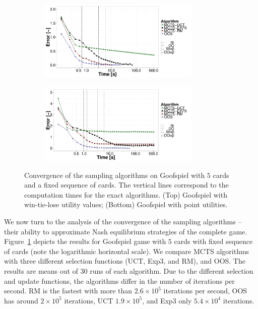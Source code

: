 \begin{figure}[t!]
	\begin{subfigure}{1\textwidth}
		\centering
		\includegraphics[width=0.85\textwidth]{figures/convergence-gs-tf.pdf}%
	\end{subfigure}
	\begin{subfigure}{1\textwidth}
		\centering
		\includegraphics[width=0.85\textwidth]{figures/convergence-gs-ff.pdf}%
	\end{subfigure}
\caption{Convergence of the sampling algorithms on Goofspiel with $5$ cards and a fixed sequence of cards.
The vertical lines correspond to the computation times for the exact algorithms.
(Top) Goofspiel with win-tie-lose utility values;
(Bottom) Goofspiel with point utilities.} \label{fig:off:conv:gs}
\end{figure}

We now turn to the analysis of the convergence of the sampling algorithms -- \ie their ability to approximate Nash equilibrium strategies of the complete game.
Figure~\ref{fig:off:conv:gs} depicts the results for Goofspiel game with $5$ cards with fixed sequence of cards (note the logarithmic horizontal scale).
We compare MCTS algorithms with three different selection functions (UCT, Exp3, and RM), and OOS.
The results are means out of $30$ runs of each algorithm.
Due to the different selection and update functions, the algorithms differ in the number of iterations per second.
RM is the fastest with more than $2.6\times 10^5$ iterations per second, OOS has around $2\times10^5$ iterations, UCT $1.9\times10^5$, and Exp3 only $5.4\times10^4$ iterations.


